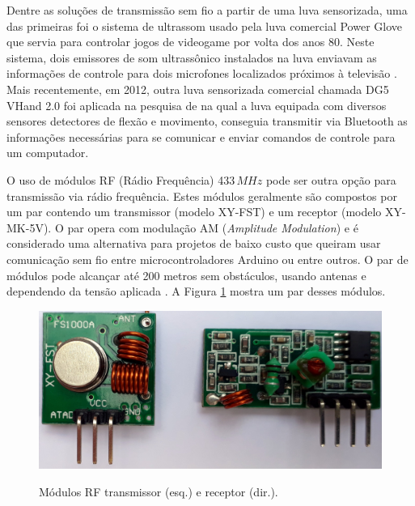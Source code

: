 \documentclass[
	12pt,				%
	openright,			%
	oneside,			%
	a4paper,			%
	english,			%
	brazil				%
	]{abntex2}
\begin{document}
		Dentre as soluções de transmissão sem fio a partir de uma luva sensorizada, uma das primeiras foi o sistema de ultrassom usado pela luva comercial Power Glove que servia para controlar jogos de videogame por volta dos anos 80. Neste sistema, dois emissores de som ultrassônico instalados na luva enviavam as informações de controle para dois microfones localizados próximos à televisão \cite{dana1989powerglove}. Mais recentemente, em 2012, outra luva sensorizada comercial chamada DG5 VHand 2.0 foi aplicada na pesquisa de \cite{kumar2012hci} na qual a luva equipada com diversos sensores detectores de flexão e movimento, conseguia transmitir via Bluetooth as informações necessárias para se comunicar e enviar comandos de controle para um computador.

		O uso de módulos RF (Rádio Frequência) 433$\,MHz$ pode ser outra opção para transmissão via rádio frequência. Estes módulos geralmente são compostos por um par contendo um transmissor (modelo XY-FST) e um receptor (modelo XY-MK-5V). O par opera com modulação AM (\textit{Amplitude Modulation}) e é considerado uma alternativa para projetos de baixo custo que queiram usar comunicação sem fio entre microcontroladores Arduino ou entre outros. O par de módulos pode alcançar até 200 metros sem obstáculos, usando antenas e dependendo da tensão aplicada \cite{institutodigitalrf}. A Figura \ref{Fig:tx-rx1} mostra um par desses módulos.



		\begin{figure}[h!]
			\centering
			\caption{Módulos RF transmissor (esq.) e receptor (dir.).}
  		\includegraphics[width=12cm]{./figures/tx-rx1.jpg}
  		\label{Fig:tx-rx1}
		\end{figure}
\end{document}
